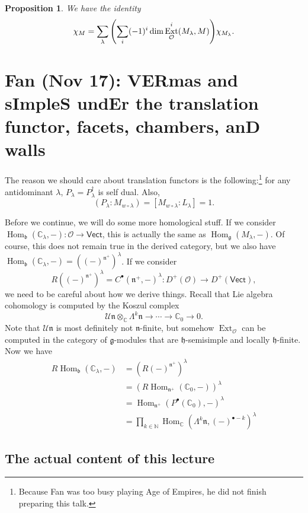 \documentclass[leqno, openany]{memoir}
\newtheorem{prop}[thm]{Proposition}
\theoremstyle{definition}
\theoremstyle{remark}
\theoremstyle{plain}
\theoremstyle{definition}
\theoremstyle{remark}
\newcommand{\N}{\mathbb{N}}
\newcommand{\C}{\mathbb{C}}
\newcommand{\U}{\mathcal{U}}
\newcommand{\cO}{\mathcal{O}}
\newcommand{\g}{\mathfrak{g}}
\newcommand{\h}{\mathfrak{h}}
\newcommand{\n}{\mathfrak{n}}
\renewcommand{\b}{\mathfrak{b}}
\newcommand{\mf}[1]{\mathfrak{#1}}
\newcommand{\ms}[1]{\mathsf{#1}}
\DeclareMathOperator{\Hom}{Hom}
\DeclareMathOperator{\Ext}{Ext}
\begin{document}
\begin{prop}
    We have the identity
    \[ \chi_M = \sum_{\lambda} \qty(\sum_i (-1)^i \dim \Ext_{\cO}^i(M_{\lambda}, M)) \chi_{M_{\lambda}}. \]
\end{prop}

\chapter{Fan (Nov 17): VERmas and sImpleS undEr the translation functor, facets, chambers, anD walls}%
\label{cha:fan_nov_17_vermas_and_simples_under_the_translation_functor_facets_chambers_and_walls}

The reason we should care about translation functors is the following:\footnote{Because Fan was too busy playing Age of Empires, he did not finish preparing this talk.} for any antidominant $\lambda$, $P_{\lambda} = P_{\lambda}^{\dag}$ is self dual. Also, 
\[ (P_{\lambda} : M_{w \circ \lambda}) = [M_{w \circ \lambda}: L_{\lambda}] = 1. \]

Before we continue, we will do some more homological stuff. If we consider $\Hom_{\mf{b}}(\C_{\lambda}, -) \colon \cO \to \ms{Vect}$, this is actually the same as $\Hom_{\g}(M_{\lambda}, -)$. Of course, this does not remain true in the derived category, but we also have $\Hom_{\mf{b}}(\C_{\lambda}, -) = ((-)^{\n^+})^{\lambda}$. If we consider
\[ R((-)^{\n^+})^{\lambda} = C^{\bullet}(\n^+, -)^{\lambda} \colon D^+(\cO) \to D^+(\ms{Vect}), \]
we need to be careful about how we derive things. Recall that Lie algebra cohomology is computed by the Koszul complex
\[ \U \n \otimes_{\C} \Lambda^k \n \to \cdots \to \C_0 \to 0. \]
Note that $\U \n$ is most definitely not $\n$-finite, but somehow $\Ext_{\cO}$ can be computed in the category of $\g$-modules that are $\h$-semisimple and locally $\h$-finite. Now we have
\begin{align*}
    R \Hom_{\b}(\C_{\lambda}, -) &= (R(-)^{\n^+})^{\lambda} \\
    &= (R \Hom_{\n^+}(\C_0, -))^{\lambda} \\
    &= \Hom_{\n^+}(P^{\bullet}(\C_0), -)^{\lambda} \\
    &= \prod_{k \in \N} \Hom_{\C}(\Lambda^k \n, (-)^{\bullet - k})^{\lambda}
\end{align*}

\section{The actual content of this lecture}%
\label{sec:the_actual_content_of_this_lecture}
\end{document}
